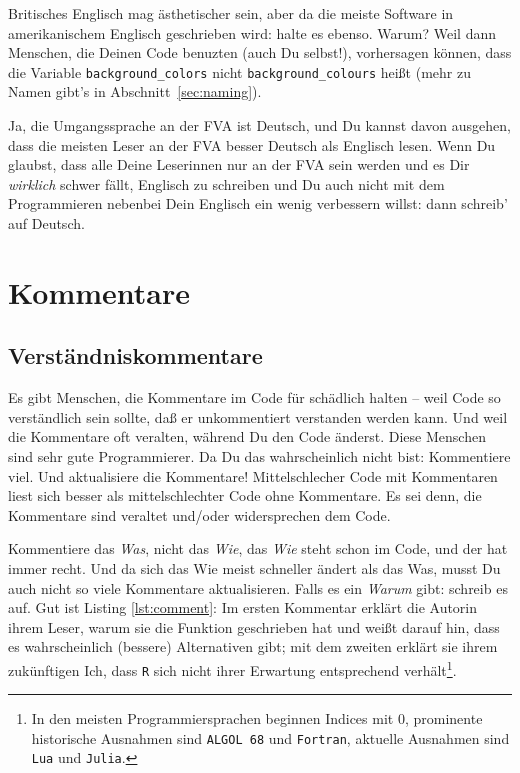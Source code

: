 \documentclass[twoside]{scrreprt}
\providecommand{\R}{\texttt{R}}
\providecommand{\code}[1]{\texttt{#1}}
\begin{document}
 Britisches Englisch mag \"a{}sthetischer sein,
aber da die meiste Software in amerikanischem Englisch geschrieben wird: halte
es ebenso. Warum? Weil dann Menschen, die Deinen Code benuzten 
(auch Du selbst!), vorhersagen k\"o{}nnen, dass die Variable
\code{background\_colors} nicht \code{background\_colours} hei\ss{}t (mehr zu
Namen gibt's in Abschnitt~\ref{sec:naming}). 

 Ja, die Umgangssprache an der FVA ist Deutsch, und Du
kannst davon ausgehen, dass die meisten Leser an der FVA besser Deutsch als
Englisch lesen. Wenn Du glaubst, dass alle Deine Leserinnen nur an der FVA
sein werden und es Dir \emph{wirklich} schwer f\"a{}llt, Englisch zu schreiben
und Du auch nicht mit dem Programmieren nebenbei Dein Englisch ein wenig
verbessern willst: dann schreib' auf Deutsch.

\section{Kommentare}
\subsection{Verst\"a{}ndniskommentare\label{sec:compcom}}
Es gibt Menschen, die Kommentare im Code f\"u{}r sch\"a{}dlich halten -- weil 
Code so verst\"a{}ndlich sein sollte, da\ss{} er unkommentiert verstanden
werden kann.
Und weil die Kommentare oft veralten, w\"a{}hrend Du den Code \"a{}nderst.
Diese Menschen sind sehr gute Programmierer.
Da Du das wahrscheinlich nicht bist:
Kommentiere viel. Und aktualisiere die Kommentare! 
Mittelschlecher Code mit Kommentaren liest sich besser als mittelschlechter  
Code ohne Kommentare. Es sei denn, die Kommentare sind veraltet und/oder 
widersprechen dem Code.

Kommentiere das \emph{Was}, nicht das \emph{Wie}, das \emph{Wie} steht schon im 
Code, und der hat immer recht.
Und da sich das Wie meist schneller \"a{}ndert als das Was, musst Du auch
nicht so viele Kommentare aktualisieren.
Falls es ein \emph{Warum} gibt: schreib es auf. 
Gut ist  Listing \ref{lst:comment}: Im ersten Kommentar erkl\"a{}rt die Autorin
ihrem Leser, warum sie die Funktion geschrieben hat und wei\ss{}t darauf hin,
dass es wahrscheinlich (bessere) Alternativen gibt; mit dem zweiten
erkl\"a{}rt sie ihrem zuk\"u{}nftigen Ich, dass \R{} sich nicht ihrer Erwartung
entsprechend verh\"a{}lt\footnote{In den meisten Programmiersprachen beginnen
    Indices mit 0, prominente historische Ausnahmen sind \texttt{ALGOL 68} und
    \texttt{Fortran}, aktuelle Ausnahmen sind \texttt{Lua} und \texttt{Julia}.}.

\end{document}
